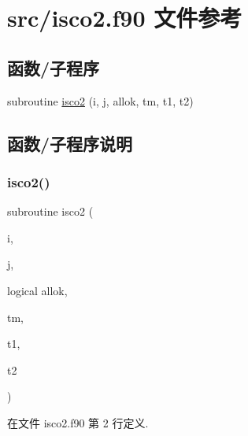 \hypertarget{isco2_8f90}{}\section{src/isco2.f90 文件参考}
\label{isco2_8f90}
\subsection*{函数/子程序}
\begin{DoxyCompactItemize}
\item 
subroutine \mbox{\hyperlink{isco2_8f90_a9ac5e001d213ecfc71a7b6d8a3b8a69d}{isco2}} (i, j, allok, tm, t1, t2)
\end{DoxyCompactItemize}


\subsection{函数/子程序说明}
\mbox{\label{isco2_8f90_a9ac5e001d213ecfc71a7b6d8a3b8a69d}} 
\subsubsection{\texorpdfstring{isco2()}{isco2()}}
{\footnotesize\ttfamily subroutine isco2 (\begin{DoxyParamCaption}\item[{}]{i,  }\item[{}]{j,  }\item[{logical}]{allok,  }\item[{}]{tm,  }\item[{}]{t1,  }\item[{}]{t2 }\end{DoxyParamCaption})}



在文件 isco2.\+f90 第 2 行定义.

